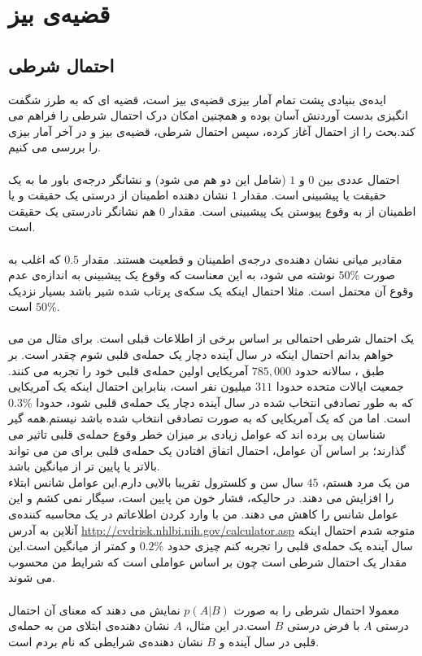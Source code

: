 \chapter{قضیه‌ی بیز}
\section{احتمال شرطی}
ایده‌ی بنیادی پشت تمام آمار بیزی قضیه‌ی بیز است، قضیه ای که به طرز شگفت انگیزی بدست آوردنش آسان بوده و همچنین امکان درک احتمال شرطی را فراهم می کند.بحث را از احتمال آغاز کرده، سپس احتمال شرطی، قضیه‌‌ی بیز و در آخر آمار بیزی را بررسی می کنیم.\\\\
احتمال عددی بین $0$ و $1$ (شامل این دو هم می شود) و نشانگر درجه‌ی باور ما به یک حقیقت یا پیشبینی است. مقدار $1$ نشان دهنده اطمینان از درستی یک حقیقت و یا اطمینان از به وقوع پیوستن یک پیشبینی است. مقدار $0$ هم نشانگر نادرستی یک حقیقت است.\\\\
مقادیر میانی نشان دهنده‌ی درجه‌ی اطمینان و قطعیت هستند. مقدار $0.5$ که اغلب به صورت $50\%$ نوشته می شود، به این معناست که وقوع یک پیشبینی به اندازه‌ی عدم وقوع آن محتمل است. مثلا احتمال اینکه یک سکه‌ی پرتاب شده شیر باشد بسیار نزدیک $50\%$ است.\\\\
یک احتمال شرطی احتمالی بر اساس برخی از اطلاعات قبلی است. برای مثال من می خواهم بدانم احتمال اینکه در سال آینده دچار یک حمله‌ی قلبی شوم چقدر است. بر طبق ، سالانه حدود $785,000$ آمریکایی اولین حمله‌ی قلبی خود را تجربه می کنند.
جمعیت ایالات متحده حدودا $311$ میلیون نفر است، بنابراین احتمال اینکه یک آمریکایی که به طور تصادفی انتخاب شده در سال آینده دچار یک حمله‌ی قلبی شود، حدودا $0.3\%$ است. اما من که یک آمریکایی که به صورت تصادفی انتخاب شده باشد نیستم.همه گیر شناسان پی برده اند که عوامل زیادی بر میزان خطر وقوع حمله‌ی قلبی تاثیر می گذارند؛ بر اساس آن عوامل، احتمال اتفاق افتادن یک حمله‌ی قلبی برای من می تواند بالاتر یا پایین تر از میانگین باشد.\\
من یک مرد هستم، $45$ سال سن و کلسترول تقریبا بالایی دارم.این عوامل شانس ابتلاء را افزایش می دهند. در حالیکه، فشار خون من پایین است، سیگار نمی کشم و  این عوامل شانس را کاهش می دهند. من با وارد کردن اطلاعاتم در یک محاسبه کننده‌ی آنلاین به آدرس \url{http://cvdrisk.nhlbi.nih.gov/calculator.asp} متوجه شدم احتمال اینکه سال آینده یک حمله‌ی قلبی را تجربه کنم چیزی حدود $0.2\%$ و کمتر از میانگین است.این مقدار یک احتمال شرطی است چون بر اساس عواملی است که شرایط من محسوب می شوند.\\\\
معمولا احتمال شرطی را به صورت $p(A|B)$ نمایش می دهند که معنای آن احتمال درستی $A$ با فرض درستی $B$ است.در این مثال، $A$ نشان دهنده‌ی ابتلای من به حمله‌ی قلبی در سال آینده و $B$ نشان دهنده‌‌ی شرایطی که نام بردم است.
